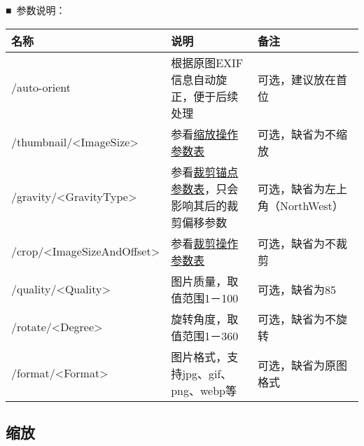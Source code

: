 \documentclass[11pt, oneside]{book}
\newcommand{\qpara}[1]{
\vspace{0.3em}
\noindent
#1\par
\vspace{0.3em}
}
\newcommand{\qtable}[1]{\footnotesize\vspace{0.5em}#1\vspace{0.5em}\normalsize}
\begin{document}
\qpara{■\ 参数说明：}
\qtable{
\def\arraystretch{2}
\begin{tabular}{|l|p{13em}|p{10em}|}
\hline
名称 & 说明 & 备注\\
\hline
/auto-orient & 根据原图EXIF信息自动旋正，便于后续处理 & 可选，建议放在首位 \\
\hline
/thumbnail/\textless ImageSize\textgreater & 参看\hyperref[thumbnail-spec]{缩放操作参数表} & 可选，缺省为不缩放 \\
\hline
/gravity/\textless GravityType\textgreater & 参看\hyperref[crop-anchor-spec]{裁剪锚点参数表}，只会影响其后的裁剪偏移参数 & 可选，缺省为左上角（NorthWest） \\
\hline
/crop/\textless ImageSizeAndOffset\textgreater & 参看\hyperref[crop-spec]{裁剪操作参数表} & 可选，缺省为不裁剪 \\
\hline
/quality/\textless Quality\textgreater & 图片质量，取值范围1－100 & 可选，缺省为85 \\
\hline
/rotate/\textless Degree\textgreater & 旋转角度，取值范围1－360 & 可选，缺省为不旋转 \\
\hline
/format/\textless Format\textgreater & 图片格式，支持jpg、gif、png、webp等 & 可选，缺省为原图格式 \\
\hline
\end{tabular}
}

\clearpage

\subsection{缩放}
\end{document}

